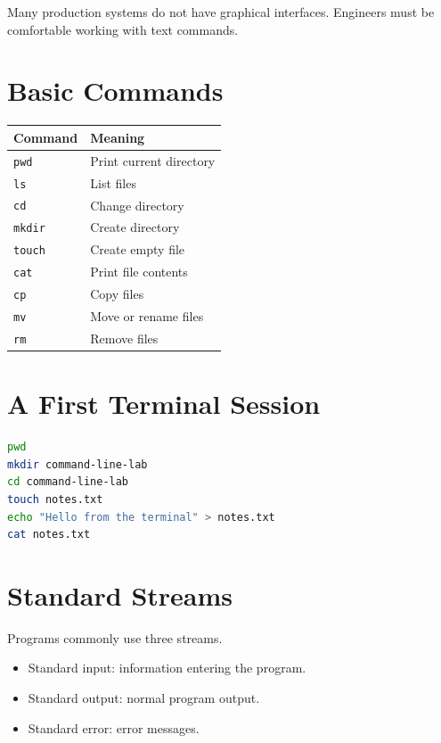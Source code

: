 Many production systems do not have graphical interfaces. Engineers must be comfortable working with text commands.

\section{Basic Commands}

\begin{center}
\begin{tabular}{ll}
\toprule
Command & Meaning \\
\midrule
\texttt{pwd} & Print current directory \\
\texttt{ls} & List files \\
\texttt{cd} & Change directory \\
\texttt{mkdir} & Create directory \\
\texttt{touch} & Create empty file \\
\texttt{cat} & Print file contents \\
\texttt{cp} & Copy files \\
\texttt{mv} & Move or rename files \\
\texttt{rm} & Remove files \\
\bottomrule
\end{tabular}
\end{center}

\section{A First Terminal Session}

\begin{lstlisting}[language=bash]
pwd
mkdir command-line-lab
cd command-line-lab
touch notes.txt
echo "Hello from the terminal" > notes.txt
cat notes.txt
\end{lstlisting}

\section{Standard Streams}

Programs commonly use three streams.

\begin{itemize}
    \item Standard input: information entering the program.
    \item Standard output: normal program output.
    \item Standard error: error messages.
\end{itemize}


